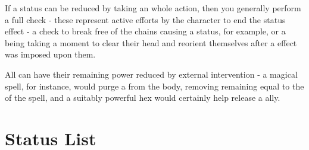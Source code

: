 If a status can be reduced by taking an whole action, then you generally perform a full  check - these represent active efforts by the character to end the status effect - a  check to break free of the chains causing a  status, for example, or a being taking a moment to clear their head and reorient themselves after a  effect was imposed upon them.

All  can have their remaining power reduced by external intervention - a magical  spell, for instance, would purge a  from the body, removing remaining   equal to the  of the spell, and a suitably powerful  hex would certainly help release a  ally. 


\section{Status List}

\newcommand\status[3]
{
	\subsubsection{\key{#1}}
	
	{\it #2}
	
	\begin{itemize}
	\renewcommand\labelitemi{\minus{}}
		#3
	\end{itemize}
}


